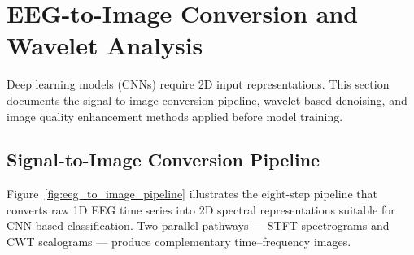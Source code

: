 \section{EEG-to-Image Conversion and Wavelet Analysis}
\label{app:eeg_to_image}

Deep learning models (CNNs) require 2D input representations. This section documents the signal-to-image conversion pipeline, wavelet-based denoising, and image quality enhancement methods applied before model training.

\subsection{Signal-to-Image Conversion Pipeline}

Figure~\ref{fig:eeg_to_image_pipeline} illustrates the eight-step pipeline that converts raw 1D EEG time series into 2D spectral representations suitable for CNN-based classification. Two parallel pathways --- STFT spectrograms and CWT scalograms --- produce complementary time--frequency images.
